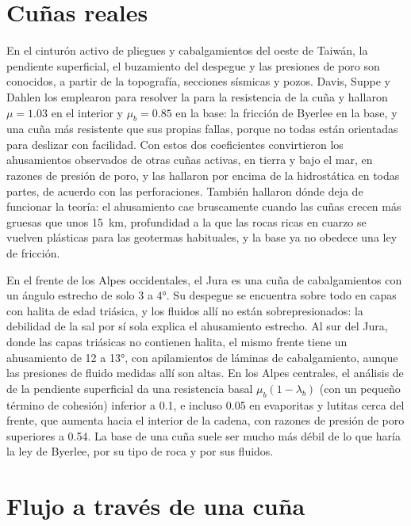 \section{Cuñas reales}\label{sec:b3:orogenic-wedges:real}

En el cinturón activo de pliegues y cabalgamientos del oeste de Taiwán, la pendiente superficial, el
buzamiento del despegue y las presiones de poro son conocidos, a partir de la topografía,
secciones sísmicas y pozos. Davis, Suppe y Dahlen los emplearon para resolver la
 para la resistencia de la cuña y hallaron $\mu = 1.03$
en el interior y $\mu_b = 0.85$ en la base: la fricción de Byerlee en la base, y una
cuña más resistente que sus propias fallas, porque no todas están orientadas para
deslizar con facilidad. Con estos dos coeficientes convirtieron los ahusamientos observados de otras
cuñas activas, en tierra y bajo el mar, en razones de presión de poro, y las hallaron
por encima de la hidrostática en todas partes, de acuerdo con las perforaciones. También hallaron
dónde deja de funcionar la teoría: el ahusamiento cae bruscamente cuando las cuñas crecen más gruesas
que unos \qty{15}{km}, profundidad a la que las rocas ricas en cuarzo se vuelven plásticas
para las geotermas habituales, y la base ya no obedece una ley de fricción.

En el frente de los Alpes occidentales, el Jura es una cuña de cabalgamientos con un
ángulo estrecho de solo 3 a \ang{4}. Su despegue se encuentra sobre todo en capas con halita
de edad triásica, y los fluidos allí no están sobrepresionados: la debilidad de la sal por sí sola
explica el ahusamiento estrecho. Al sur del Jura, donde las
capas triásicas no contienen halita, el mismo frente tiene un ahusamiento de 12 a
\ang{13}, con apilamientos de láminas de cabalgamiento, aunque las presiones de fluido medidas
allí son altas. En los Alpes centrales, el análisis de  de la pendiente
superficial da una resistencia basal $\mu_b(1 - \lambda_b)$ (con un pequeño término de
cohesión) inferior a 0.1, e incluso 0.05 en evaporitas y lutitas cerca del frente,
que aumenta hacia el interior de la cadena, con razones de presión de poro superiores a 0.54. La
base de una cuña suele ser mucho más débil de lo que haría la ley de Byerlee, por su
tipo de roca y por sus fluidos.

\section{Flujo a través de una cuña}\label{sec:b3:orogenic-wedges:flux}

